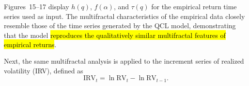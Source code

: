 \documentclass[preprints,article,accept,pdftex,oneauthor]{Definitions/mdpi}
\begin{document}
Figures~15--17 display  $h(q)$, $f(\alpha)$, and  $\tau(q)$ for the empirical return time series used as input. The multifractal characteristics of the empirical data closely resemble those of the time series generated by the QCL model, demonstrating that the model  \hl{reproduces the qualitatively similar multifractal features of empirical returns}.








Next, the same multifractal analysis is applied to the increment series of realized
volatility (IRV), defined as
\begin{equation}
  \mathrm{IRV}_t = \ln\mathrm{RV}_t - \ln\mathrm{RV}_{t-1}.
  \label{eq:irv}
\end{equation}
\end{document}
